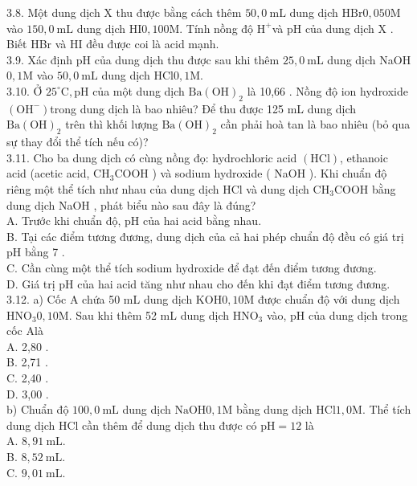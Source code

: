 \documentclass[10pt]{article}
\begin{document}
3.8. Một dung dịch X thu được bằng cách thêm $50,0 \mathrm{~mL}$ dung dịch $\mathrm{HBr} 0,050 \mathrm{M}$ vào $150,0 \mathrm{~mL}$ dung dịch $\mathrm{HI} 0,100 \mathrm{M}$. Tính nồng độ $\mathrm{H}^{+}$và pH của dung dịch X . Biết HBr và HI đều được coi là acid mạnh.\\
3.9. Xác định pH của dung dịch thu được sau khi thêm $25,0 \mathrm{~mL}$ dung dịch NaOH $0,1 \mathrm{M}$ vào $50,0 \mathrm{~mL}$ dung dịch $\mathrm{HCl} 0,1 \mathrm{M}$.\\
3.10. Ở $25^{\circ} \mathrm{C}, \mathrm{pH}$ của một dung dịch $\mathrm{Ba}(\mathrm{OH})_{2}$ là 10,66 . Nồng độ ion hydroxide $\left(\mathrm{OH}^{-}\right)$trong dung dịch là bao nhiêu? Để thu được 125 mL dung dịch $\mathrm{Ba}(\mathrm{OH})_{2}$ trên thì khối lượng $\mathrm{Ba}(\mathrm{OH})_{2}$ cần phải hoà tan là bao nhiêu (bỏ qua sự thay đổi thể tích nếu có)?\\
3.11. Cho ba dung dịch có cùng nồng đọ: hydrochloric acid $(\mathrm{HCl})$, ethanoic acid (acetic acid, $\mathrm{CH}_{3} \mathrm{COOH}$ ) và sodium hydroxide ( NaOH ). Khi chuẩn độ riêng một thể tích như nhau của dung dịch HCl và dung dịch $\mathrm{CH}_{3} \mathrm{COOH}$ bằng dung dịch NaOH , phát biểu nào sau đây là đúng?\\
A. Trước khi chuẩn độ, pH của hai acid bằng nhau.\\
B. Tại các điểm tương đương, dung dịch của cả hai phép chuẩn độ đều có giá trị pH bằng 7 .\\
C. Cần cùng một thể tích sodium hydroxide để đạt đến điểm tương đương.\\
D. Giá trị pH của hai acid tăng như nhau cho đến khi đạt điểm tương đương.\\
3.12. a) Cốc A chứa 50 mL dung dịch $\mathrm{KOH} 0,10 \mathrm{M}$ được chuẩn độ với dung dịch $\mathrm{HNO}_{3} 0,10 \mathrm{M}$. Sau khi thêm 52 mL dung dịch $\mathrm{HNO}_{3}$ vào, pH của dung dịch trong cốc Alà\\
A. 2,80 .\\
B. 2,71 .\\
C. 2,40 .\\
D. 3,00 .\\
b) Chuẩn độ $100,0 \mathrm{~mL}$ dung dịch $\mathrm{NaOH} 0,1 \mathrm{M}$ bằng dung dịch $\mathrm{HCl} 1,0 \mathrm{M}$. Thể tích dung dịch HCl cần thêm để dung dịch thu được có $\mathrm{pH}=12$ là\\
A. $8,91 \mathrm{~mL}$.\\
B. $8,52 \mathrm{~mL}$.\\
C. $9,01 \mathrm{~mL}$.\\
\end{document}
